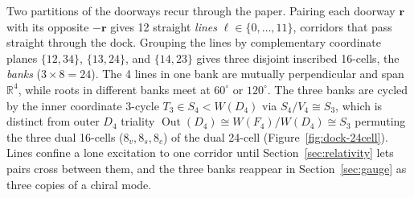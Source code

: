 Two partitions of the doorways recur through the paper. Pairing each doorway $\mathbf{r}$ with its opposite
$-\mathbf{r}$ gives 12 straight \emph{lines} $\ell \in \{0, \ldots, 11\}$, corridors that pass straight through the
dock. Grouping the lines by complementary coordinate planes $\{12, 34\}$, $\{13, 24\}$, and $\{14, 23\}$ gives three
disjoint inscribed 16-cells, the \emph{banks} ($3 \times 8 = 24$). The 4 lines in one bank are mutually perpendicular
and span $\mathbb{R}^4$, while roots in different banks meet at $60^\circ$ or $120^\circ$. The three banks are cycled
by the inner coordinate 3-cycle
$T_3 \in S_4 < W(D_4)$ via $S_4/V_4 \cong S_3$, which is distinct from outer $D_4$ triality
$\operatorname{Out}(D_4) \cong W(F_4)/W(D_4) \cong S_3$ permuting the three dual 16-cells ($8_v, 8_s, 8_c$) of the
dual 24-cell (Figure~\ref{fig:dock-24cell}). Lines confine a lone excitation to one corridor until
Section~\ref{sec:relativity} lets pairs cross between them, and the three banks reappear in Section~\ref{sec:gauge} as
three copies of a chiral mode.

